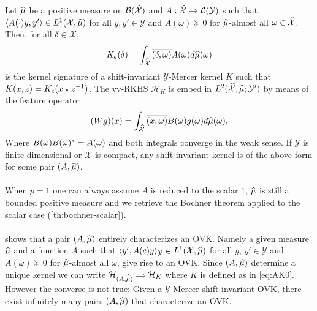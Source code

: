 \documentclass[twoside,11pt]{article}
\begin{document}
\begin{proposition}
    \label{pr:mercer_kernel_bochner}
    Let $\widehat{\mu}$ be a positive measure on
    $\mathcal{B}(\mathcal{\widehat{\mathcal{X}}})$ and $A: \widehat{\mathcal{X}}\to
    \mathcal{L}(\mathcal{Y})$ such that $\langle A(\cdot)y,y'\rangle\in
    L^1(\mathcal{X},\widehat{\mu})$ for all $y,y'\in\mathcal{Y}$ and
    $A(\omega)\succcurlyeq 0$ for $\widehat{\mu}$-almost all
    $\omega\in\widehat{\mathcal{X}}$. Then, for all $\delta \in \mathcal{X}$,
    \begin{dmath}
        \label{eq:AK0}
        K_e(\delta)=\int_{\dual{\mathcal{X}}} \conj{\pairing{\delta, \omega}}
        A(\omega) d\dual{\mu}(\omega)
    \end{dmath}
    is the kernel signature of a shift-invariant $\mathcal{Y}$-Mercer kernel
    $K$ such that $K(x,z)=K_e(x \star {z}^{-1})$. The \acs{vv-RKHS}
    $\mathcal{H}_K$ is embed in
    $L^2(\widehat{\mathcal{X}},\widehat{\mu};\mathcal{Y}')$ by means of the feature
    operator
    \begin{dmath}
        \label{eq:feature_operator}
        (Wg)(x)=\int_{\mathcal{\dual{X}}} \conj{\pairing{x,\omega}} B(\omega)
        g(\omega) d\dual{\mu}(\omega),
    \end{dmath}
    Where $B(\omega)B(\omega)^*=A(\omega)$ and both integrals converge
    in the weak sense. If $\mathcal{Y}$ is finite dimensional or $\mathcal{X}$
    is compact, any shift-invariant kernel is of the above form for some pair
    $(A, \widehat{\mu})$.
\end{proposition}
\paragraph{}
When $p=1$ one can always assume $A$ is reduced to the scalar $1$, $\widehat{\mu}$
is still a bounded positive measure and we retrieve the Bochner theorem applied
to the scalar case (\cref{th:bochner-scalar}).
\paragraph{}
 shows that a pair $(A,\widehat{\mu})$ entirely
characterizes an \acs{OVK}. Namely a given measure $\widehat{\mu}$ and a function
$A$ such that $\langle y', A(c\dot)y\rangle_{\mathcal{Y}}\in
L^1(\mathcal{X},\widehat{\mu})$ for all $y$, $y'\in\mathcal{Y}$ and
$A(\omega)\succcurlyeq 0$ for $\widehat{\mu}$-almost all $\omega$, give rise to an
\acs{OVK}. Since $(A,\widehat{\mu})$ determine a unique kernel we can write
$\mathcal{H}_{(A,\widehat{\mu})}{\scriptstyle\implies}\mathcal{H}_K$ where $K$ is
defined as in \cref{eq:AK0}. However the converse is not true: Given a
$\mathcal{Y}$-Mercer shift invariant \acl{OVK}, there exist infinitely many
pairs $(A,\widehat{\mu})$ that characterize an \acs{OVK}.
\end{document}
